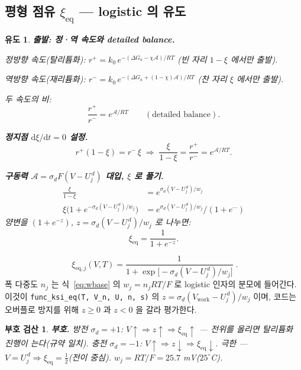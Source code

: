 \documentclass[11pt,a4paper]{article}
\newtheorem*{signbox}{부호 검산}
\newtheorem*{derivebox}{유도}
\newcommand{\dd}{\mathrm{d}}
\newcommand{\eq}{\mathrm{eq}}
\newcommand{\work}{\mathrm{work}}
\newcommand{\code}[1]{\texttt{#1}}
\begin{document}
\subsection{평형 점유 $\xi_\eq$ — logistic 의 유도}

\begin{derivebox}
\textbf{출발: 정·역 속도와 detailed balance.}

정방향 속도(탈리튬화): $r^+=k_0\,e^{-(\Delta G_{a}-\chi\mathcal A)/RT}$ (빈 자리 $1-\xi$ 에서만 출발).

역방향 속도(재리튬화): $r^-=k_0\,e^{-(\Delta G_{a}+(1-\chi)\mathcal A)/RT}$ (찬 자리 $\xi$ 에서만 출발).

두 속도의 비:
\begin{equation*}
\frac{r^+}{r^-}=e^{\mathcal A/RT}\qquad(\text{detailed balance}).
\end{equation*}

\textbf{정지점 $\dd\xi/\dd t=0$ 설정.}
\begin{equation*}
r^+(1-\xi)=r^-\,\xi
\;\Longrightarrow\;
\frac{\xi}{1-\xi}=\frac{r^+}{r^-}=e^{\mathcal A/RT}.
\end{equation*}

\textbf{구동력 $\mathcal A=\sigma_d F(V-U_j^{\,d})$ 대입, $\xi$ 로 풀기.}
\begin{align*}
\frac{\xi}{1-\xi}&=e^{\sigma_d(V-U_j^{\,d})/w_j}\\
\xi\big(1+e^{-\sigma_d(V-U_j^{\,d})/w_j}\big)&=e^{\sigma_d(V-U_j^{\,d})/w_j}/(1+e^{\cdots})
\end{align*}
양변을 $(1+e^{-z})$, $z=\sigma_d(V-U_j^{\,d})/w_j$ 로 나누면:
\begin{equation*}
\xi_\eq=\frac{1}{1+e^{-z}}.
\end{equation*}
\end{derivebox}
\begin{equation}
\boxed{\;\xi_{\eq,j}(V,T)=\frac{1}{1+\exp\!\big[-\sigma_d(V-U_j^{\,d})/w_j\big]}\;.}
\label{eq:xieq}
\end{equation}
폭 다중도 $n_j$ 는 식~\eqref{eq:wbase} 의 $w_j=n_jRT/F$ 로 logistic 인자의 분모에 들어간다. 이것이
\code{func\_ksi\_eq(T, V\_n, U, n, s)} 의 $z=\sigma_d(V_\work-U_j^{\,d})/w_j$ 이며, 코드는 오버플로 방지를 위해
$z\ge0$ 과 $z<0$ 을 갈라 평가한다.

\begin{signbox}
\textbf{부호.} 방전 $\sigma_d=+1$: $V\!\uparrow\Rightarrow z\!\uparrow\Rightarrow\xi_\eq\!\uparrow$ — 전위를 올리면
탈리튬화 진행이 는다(규약 일치). 충전 $\sigma_d=-1$: $V\!\uparrow\Rightarrow z\!\downarrow\Rightarrow\xi_\eq\!\downarrow$.
극한 — $V=U_j^{\,d}\Rightarrow\xi_\eq=\tfrac12$(전이 중심). $w_j=RT/F=25.7$ mV($25^\circ$C).
\end{signbox}
\end{document}

